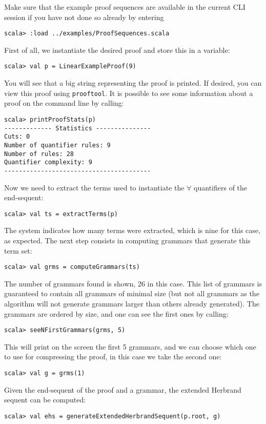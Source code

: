 \documentclass[a4paper,11pt]{article}
\begin{document}
Make sure that the example proof sequences are available in the current CLI
session if you have not done so already by entering
\begin{lstlisting}
scala> :load ../examples/ProofSequences.scala
\end{lstlisting}
%
First of all, we instantiate the desired proof and store this in a variable:
\begin{lstlisting}
scala> val p = LinearExampleProof(9)
\end{lstlisting}

You will see that a big string representing the proof is printed. If desired,
you can view this proof using \texttt{prooftool}. 
It is possible to see some information about a proof on the command line by calling:
\begin{lstlisting}
scala> printProofStats(p)
------------- Statistics ---------------
Cuts: 0
Number of quantifier rules: 9
Number of rules: 28
Quantifier complexity: 9
----------------------------------------
\end{lstlisting}
Now we need to
extract the terms used to instantiate the $\forall$ quantifiers of the
end-sequent:
\begin{lstlisting}
scala> val ts = extractTerms(p)
\end{lstlisting}
The system indicates how many terms were extracted, which is nine for this case,
as expected. The next step consists in computing grammars that generate this
term set:
\begin{lstlisting}
scala> val grms = computeGrammars(ts)
\end{lstlisting}
The number of grammars found is shown, 26 in this case. This list of grammars is guaranteed
to contain all grammars of minimal size (but not all grammars as the algorithm
will not generate grammars larger than others already generated).
The grammars are ordered by size, and one can see the first ones by calling:
\begin{lstlisting}
scala> seeNFirstGrammars(grms, 5)
\end{lstlisting}
This will print on the screen the first 5 grammars, and we can choose which one
to use for compressing the proof, in this case we take the second one:
\begin{lstlisting}
scala> val g = grms(1)
\end{lstlisting}
Given the end-sequent of the proof and a grammar, the extended Herbrand sequent can be computed:
\begin{lstlisting}
scala> val ehs = generateExtendedHerbrandSequent(p.root, g)
\end{lstlisting}
\end{document}
